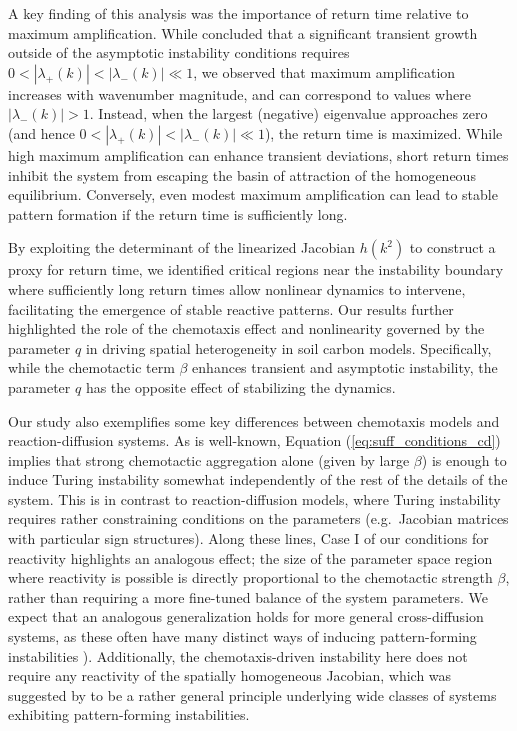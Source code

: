 \documentclass{article}
\begin{document}
{A key finding of this analysis was the importance of return time relative to maximum amplification. While  \cite{klika2017significance} concluded that a significant transient growth outside of the asymptotic instability conditions requires $0 < |\lambda_+({k})| < |\lambda_-({k})| \ll 1$, we observed that maximum amplification increases with wavenumber magnitude, and can correspond to values where $|\lambda_-({k})| > 1$. Instead, when the largest (negative) eigenvalue approaches zero (and hence $0 < |\lambda_+({k})| < |\lambda_-({k})| \ll 1$), the return time is maximized. While high maximum amplification can enhance transient deviations, short return times inhibit the system from escaping the basin of attraction of the homogeneous equilibrium. Conversely, even modest maximum amplification can lead to stable pattern formation if the return time is sufficiently long.

By exploiting the determinant of the linearized Jacobian $h(k^2)$ to construct a proxy for return time, we identified critical regions near the instability boundary where sufficiently long return times allow nonlinear dynamics to intervene, facilitating the emergence of stable reactive patterns. Our results further highlighted the role of the chemotaxis effect and nonlinearity governed by the parameter $q$ in driving spatial heterogeneity in soil carbon models. Specifically, while the chemotactic term $\beta$ enhances transient and asymptotic instability, the parameter $q$ has the opposite effect of stabilizing the dynamics. 

{Our study also exemplifies some key differences between chemotaxis models and reaction-diffusion systems. As is well-known, Equation (\ref{eq:suff_conditions_cd}) implies that strong chemotactic aggregation alone (given by large $\beta$) is enough to induce Turing instability somewhat independently of the rest of the details of the system. This is in contrast to reaction-diffusion models, where Turing instability requires rather constraining conditions on the parameters (e.g.~Jacobian matrices with particular sign structures).  Along these lines, Case I of our conditions for reactivity highlights an analogous effect; the size of the parameter space region where reactivity is possible is directly proportional to the chemotactic strength $\beta$, rather than requiring a more fine-tuned balance of the system parameters. We expect that an analogous generalization holds for more general cross-diffusion systems, as these often have many distinct ways of inducing pattern-forming instabilities \cite{villar2024designing}). Additionally, the chemotaxis-driven instability here does not require any reactivity of the spatially homogeneous Jacobian, which was suggested by \cite{NEUBERT2002} to be a rather general principle underlying wide classes of systems exhibiting pattern-forming instabilities.}

}
\end{document}
